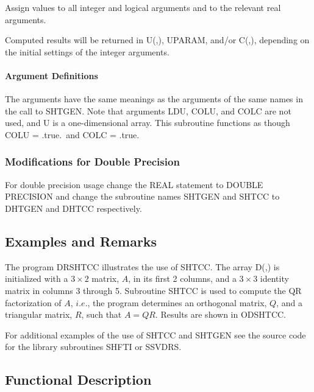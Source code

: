 \documentclass[twoside]{MATH77}
\begin{document}
Assign values to all integer and logical arguments and to the relevant real
arguments.

\begin{center}
\end{center}

Computed results will be returned in U(,), UPARAM, and/or C(,),
depending on the initial settings of the integer arguments.

\paragraph{Argument Definitions}

The arguments have the same meanings as the arguments of the same names in
the call to SHTGEN. Note that arguments LDU, COLU, and COLC are not used,
and U is a one-dimensional array. This subroutine functions as though COLU
= .true.\ and COLC = .true.

\subsubsection{Modifications for Double Precision}

For double precision usage change the REAL statement to DOUBLE PRECISION and
change the subroutine names SHTGEN and SHTCC to DHTGEN and DHTCC
respectively.

\subsection{Examples and Remarks}

The program DRSHTCC illustrates the use of SHTCC. The array D(,) is
initialized with a $3\times 2$ matrix, $A$, in its first 2 columns, and a $%
3\times 3$ identity matrix in columns 3 through 5. Subroutine SHTCC is used
to compute the QR factorization of $A$, $i.e.$, the program determines an
orthogonal matrix, $Q$, and a triangular matrix, $R$, such that $A = Q R$.
Results are shown in ODSHTCC.

For additional examples of the use of SHTCC and SHTGEN see the source code
for the library subroutines SHFTI or SSVDRS.

\subsection{Functional Description}
\end{document}
